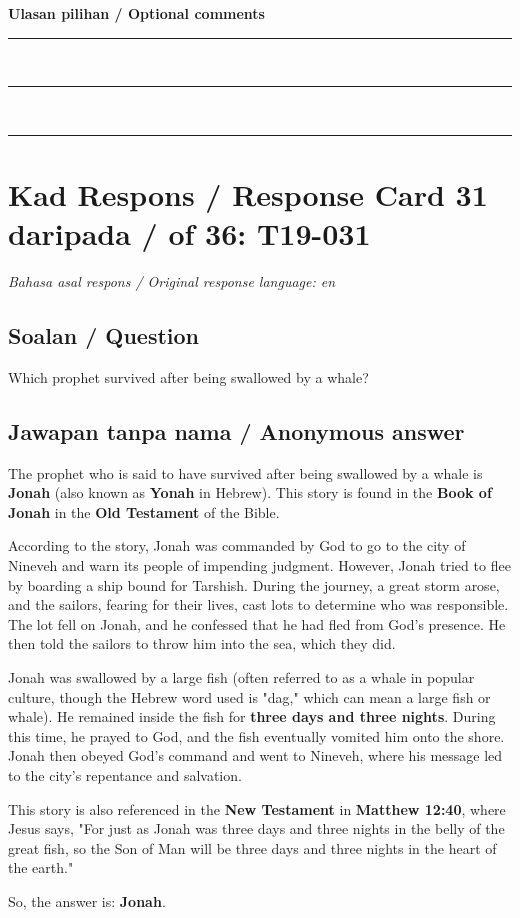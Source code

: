 \documentclass[11pt,a4paper]{article}
\begin{document}
\medskip
\textbf{Ulasan pilihan / Optional comments}\\[3pt]
\rule{\textwidth}{0.4pt}\\[16pt]
\rule{\textwidth}{0.4pt}\\[16pt]
\rule{\textwidth}{0.4pt}

\newpage
\section*{Kad Respons / Response Card 31 daripada / of 36: T19-031}
\textit{Bahasa asal respons / Original response language: en}

\subsection*{Soalan / Question}
Which prophet survived after being swallowed by a whale?

\subsection*{Jawapan tanpa nama / Anonymous answer}
The prophet who is said to have survived after being swallowed by a whale is \textbf{Jonah} (also known as \textbf{Yonah} in Hebrew). This story is found in the \textbf{Book of Jonah} in the \textbf{Old Testament} of the Bible.\par\medskip According to the story, Jonah was commanded by God to go to the city of Nineveh and warn its people of impending judgment. However, Jonah tried to flee by boarding a ship bound for Tarshish. During the journey, a great storm arose, and the sailors, fearing for their lives, cast lots to determine who was responsible. The lot fell on Jonah, and he confessed that he had fled from God's presence. He then told the sailors to throw him into the sea, which they did.\par\medskip Jonah was swallowed by a large fish (often referred to as a whale in popular culture, though the Hebrew word used is "dag," which can mean a large fish or whale). He remained inside the fish for \textbf{three days and three nights}. During this time, he prayed to God, and the fish eventually vomited him onto the shore. Jonah then obeyed God's command and went to Nineveh, where his message led to the city's repentance and salvation.\par\medskip This story is also referenced in the \textbf{New Testament} in \textbf{Matthew 12:40}, where Jesus says, "For just as Jonah was three days and three nights in the belly of the great fish, so the Son of Man will be three days and three nights in the heart of the earth."\par\medskip So, the answer is: \textbf{Jonah}.
\end{document}

